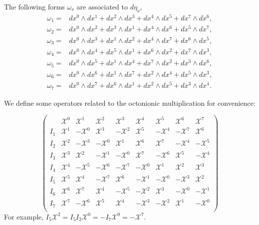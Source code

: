 \documentclass[reqno,12pt]{amsart}
\numberwithin{equation}{section}
\theoremstyle{plain}
\theoremstyle{definition}
\begin{document}
The following forms $\omega_\nu$ are associated to $d\eta_\nu$,
\small{\begin{align*}
    \omega_1=& dx^0\wedge dx^1+dx^2\wedge dx^3+dx^4\wedge dx^5+dx^7\wedge dx^6,\\
    \omega_2=&dx^0\wedge dx^2+dx^3\wedge dx^1+dx^4\wedge dx^6+dx^5\wedge dx^7,\\
    \omega_3=&dx^0\wedge dx^3+dx^1\wedge dx^2+dx^4\wedge dx^7+dx^6\wedge dx^5,\\
    \omega_4=&dx^0\wedge dx^4+dx^5\wedge dx^1+dx^6\wedge dx^2+dx^7\wedge dx^3,\\
    \omega_5=&dx^0\wedge dx^5+dx^1\wedge dx^4+dx^7\wedge dx^2+dx^3\wedge dx^6,
    \\\omega_6=&dx^0\wedge dx^6+dx^1\wedge dx^7+dx^2\wedge dx^4+dx^5\wedge dx^3,
    \\  
    \omega_7=&dx^0\wedge dx^7+dx^6\wedge dx^1+dx^2\wedge dx^5+dx^3\wedge dx^4.   \end{align*}}

We define some operators related to the octonionic multiplication for convenience:

   
\begin{equation*}
   \left(
    \begin{array}{ccccccccc}
&\mathscr{X}^0&\mathscr{X}^1&\mathscr{X}^2& \mathscr{X}^3& \mathscr{X}^4&\mathscr{X}^5& \mathscr{X}^6& \mathscr{X}^7\\ 
I_1&\mathscr{X}^1&-\mathscr{X}^0&\mathscr{X}^3& -\mathscr{X}^2& \mathscr{X}^5&-\mathscr{X}^4& -\mathscr{X}^7& \mathscr{X}^6\\ 
I_2&\mathscr{X}^2&-\mathscr{X}^3&-\mathscr{X}^0& \mathscr{X}^1& \mathscr{X}^6&\mathscr{X}^7& -\mathscr{X}^4& -\mathscr{X}^5\\ 
I_3&\mathscr{X}^3&\mathscr{X}^2&-\mathscr{X}^1& -\mathscr{X}^0& \mathscr{X}^7&-\mathscr{X}^6& \mathscr{X}^5& -\mathscr{X}^4\\ 
I_4&\mathscr{X}^4&-\mathscr{X}^5&-\mathscr{X}^6& -\mathscr{X}^7& -\mathscr{X}^0&\mathscr{X}^1& \mathscr{X}^2& \mathscr{X}^3\\
I_5&\mathscr{X}^5&\mathscr{X}^4&-\mathscr{X}^7& \mathscr{X}^6& -\mathscr{X}^1&-\mathscr{X}^0& -\mathscr{X}^3& \mathscr{X}^2\\ 
I_6&\mathscr{X}^6&\mathscr{X}^7&\mathscr{X}^4& -\mathscr{X}^5& -\mathscr{X}^2&\mathscr{X}^3& -\mathscr{X}^0& -\mathscr{X}^1\\ 
I_7&\mathscr{X}^7&-\mathscr{X}^6&\mathscr{X}^5& \mathscr{X}^4& -\mathscr{X}^3&-\mathscr{X}^2& \mathscr{X}^1& -\mathscr{X}^0\\ 
\end{array}
    \right)
    \end{equation*}
For example, $I_5\mathscr{X}^2=I_5I_2\mathscr{X}^0=-I_7\mathscr{X}^0=-\mathscr{X}^7$. 
\end{document}
